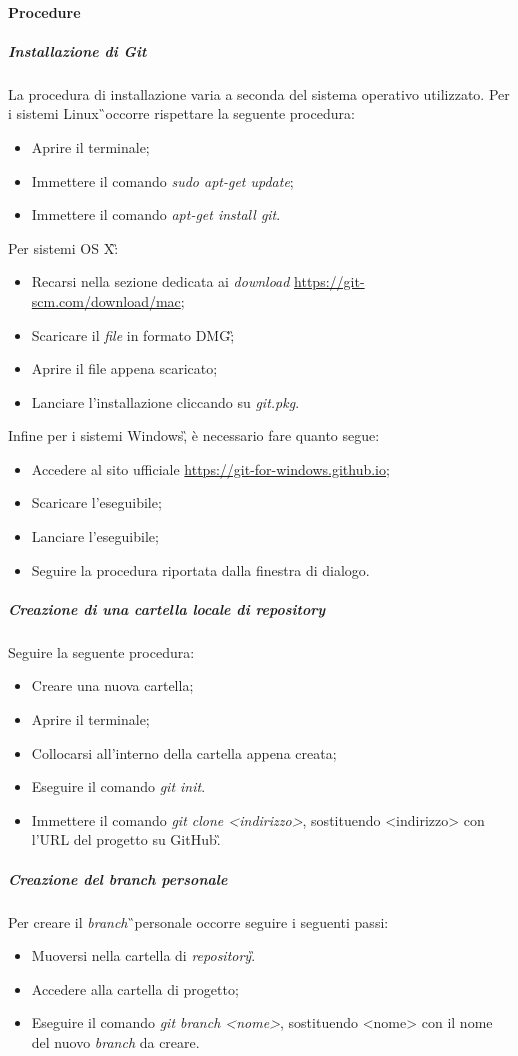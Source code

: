 \paragraph{Procedure} 
\subparagraph{Installazione di Git} La procedura di installazione varia a seconda del sistema operativo utilizzato. Per i sistemi Linux\G\ occorre rispettare la seguente procedura:
\begin{itemize}
\item Aprire il terminale;
\item Immettere il comando \textit{sudo apt-get update};
\item Immettere il comando \textit{apt-get install git}.
\end{itemize}
Per sistemi OS X\G:
\begin{itemize}
\item Recarsi nella sezione dedicata ai \textit{download} \url{https://git-scm.com/download/mac};
\item Scaricare il \textit{file} in formato DMG\G;
\item Aprire il file appena scaricato;
\item Lanciare l'installazione cliccando su\textit{ git.pkg}.
\end{itemize}
Infine per i sistemi Windows\G, è necessario fare quanto segue:
\begin{itemize}
\item Accedere al sito ufficiale \url{https://git-for-windows.github.io};
\item Scaricare l'eseguibile;
\item Lanciare l'eseguibile;
\item Seguire la procedura riportata dalla finestra di dialogo.
\end{itemize}

\subparagraph{Creazione di una cartella locale di repository} Seguire la seguente procedura:
\begin{itemize}
\item Creare una nuova cartella;
\item Aprire il terminale;
\item Collocarsi all'interno della cartella appena creata;
\item Eseguire il comando \textit{git init}.
\item Immettere il comando \textit{git clone <indirizzo>}, sostituendo <indirizzo> con l'URL del progetto su GitHub\G.
\end{itemize}

\subparagraph{Creazione del branch personale} Per creare il \textit{branch}\G\ personale occorre seguire i seguenti passi:
\begin{itemize}
\item Muoversi nella cartella di \textit{repository}\G.
\item Accedere alla cartella di progetto;
\item Eseguire il comando \textit{git branch <nome>}, sostituendo <nome> con il nome del nuovo \textit{branch} da creare.
\end{itemize}

